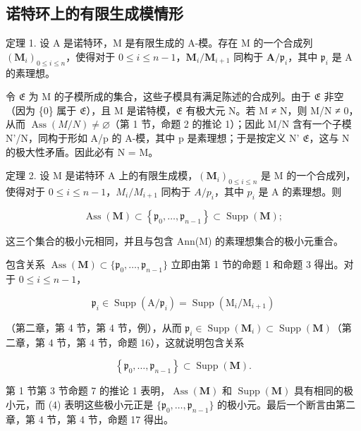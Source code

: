 \subsection{诺特环上的有限生成模情形}

定理 1. 设 A 是诺特环，M 是有限生成的 A-模。存在 M 的一个合成列 \((\mathbf{M}_i)_{0\leqslant i\leqslant n}\)，使得对于 \(0\leqslant i\leqslant n - 1\)，\(\mathbf{M}_i / \mathbf{M}_{i + 1}\) 同构于 \(\mathbf{A} / \mathfrak{p}_i\)，其中 \(\mathfrak{p}_i\) 是 A 的素理想。

令 \(\mathfrak{E}\) 为 M 的子模所成的集合，这些子模具有满足陈述的合成列。由于 \(\mathfrak{E}\) 非空（因为 \{0\} 属于 \(\mathfrak{E}\)），且 M 是诺特模，\(\mathfrak{E}\) 有极大元 N。若 M ≠ N，则 M/N ≠ 0，从而 \(\operatorname{Ass}(M/N) \neq \varnothing\)（第 1 节，命题 2 的推论 1）；因此 M/N 含有一个子模 N'/N，同构于形如 A/p 的 A-模，其中 p 是素理想；于是按定义 N' \(\mathfrak{E}\)，这与 N 的极大性矛盾。因此必有 N = M。

定理 2. 设 M 是诺特环 A 上的有限生成模，\((\mathbf{M}_{i})_{0\leqslant i\leqslant n}\) 是 M 的一个合成列，使得对于 \(0\leqslant i\leqslant n-1\)，\(M_{i}/M_{i+1}\) 同构于 \(A/p_{i}\)，其中 \(p_{i}\) 是 A 的素理想。则

\[
\operatorname{Ass} (\mathbf {M}) \subset \left\{\mathfrak {p} _ {0}, \dots , \mathfrak {p} _ {n - 1} \right\} \subset \operatorname{Supp} (\mathbf {M});\tag{4}
\]

这三个集合的极小元相同，并且与包含 Ann(M) 的素理想集合的极小元重合。

包含关系 \(\operatorname{Ass}(\mathbf{M}) \subset \{\mathfrak{p}_0, \ldots, \mathfrak{p}_{n-1}\}\) 立即由第 1 节的命题 1 和命题 3 得出。对于 \(0 \leqslant i \leqslant n - 1\)，

\[
\mathfrak {p} _ {i} \in \operatorname{Supp} (\mathrm{A} / \mathfrak {p} _ {i}) = \operatorname{Supp} (\mathrm{M} _ {i} / \mathrm{M} _ {i + 1})
\]

（第二章，第 4 节，第 4 节，例），从而 \(\mathfrak{p}_i \in \operatorname{Supp}(\mathbf{M}_i) \subset \operatorname{Supp}(\mathbf{M})\)（第二章，第 4 节，第 4 节，命题 16），这就说明包含关系

\[
\left\{\mathfrak {p} _ {0}, \dots , \mathfrak {p} _ {n - 1} \right\} \subset \operatorname{Supp} (\mathbf {M}).
\]

第 1 节第 3 节命题 7 的推论 1 表明，\(\operatorname{Ass}(\mathbf{M})\) 和 \(\operatorname{Supp}(\mathbf{M})\) 具有相同的极小元，而 (4) 表明这些极小元正是 \(\{\mathfrak{p}_0, \ldots, \mathfrak{p}_{n-1}\}\) 的极小元。最后一个断言由第二章，第 4 节，第 4 节，命题 17 得出。

